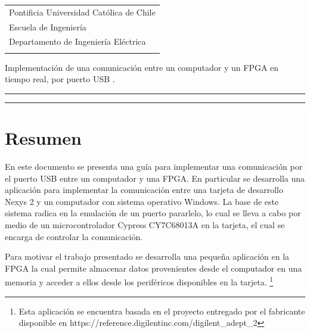 \documentclass[11pt,letterpaper,spanish]{article}
\begin{document}
\renewcommand{\tablename}{Tabla}

    \begin{tabular}{l}%
    Pontificia Universidad Cat\'olica de Chile\\
    Escuela de Ingenier\'ia\\
    Departamento de Ingenier\'ia El\'ectrica\\
  \vspace{1.9 cm}\mbox{}
    \end{tabular}
    \bigskip
 
\begin{center}
\huge{Implementación de una comunicación entre un computador y un FPGA en tiempo real, por puerto USB .}\\
\vspace{0.5 cm}
\hrule
\vspace{0.1 cm}
\hrule
\end{center}
\vspace{0.2 cm}
\section{Resumen}
\par 
	En este documento se presenta una guía para implementar una comunicación por el puerto USB entre un computador y una  FPGA. En particular se desarrolla una aplicación para implementar la comunicación entre una tarjeta de desarrollo Nexys 2 y un computador con sistema operativo Windows. La base de este sistema radica en la emulación de un puerto pararlelo, lo cual se lleva a cabo por medio de un microcontrolador Cypress CY7C68013A en la tarjeta, el cual se encarga de controlar la comunicación. 
	
	Para motivar el trabajo presentado se desarrolla una pequeña aplicación en la FPGA la cual permite almacenar datos provenientes desde el computador en una memoria y acceder a ellos desde los periféricos disponibles en la tarjeta. \footnote{Esta aplicación se encuentra basada en el proyecto entregado por el fabricante disponible en https://reference.digilentinc.com/digilent\_adept\_2}
\end{document}
